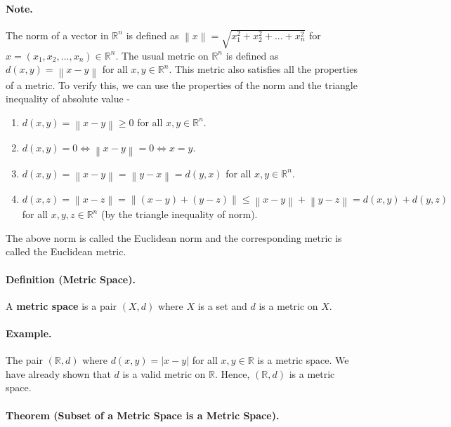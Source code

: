 \documentclass[openany]{book}
\numberwithin{equation}{section}
\begin{document}
\paragraph{Note.}

    The norm of a vector in $\mathbb{R}^n$ is defined as $\left\| x \right\| = \sqrt{x_1^2 + x_2^2 + ... + x_n^2}$ for $x = (x_1, x_2, ..., x_n) \in \mathbb{R}^n$. The usual metric on $\mathbb{R}^n$ is defined as $d(x, y) = \left\| x - y \right\|$ for all $x, y \in \mathbb{R}^n$. This metric also satisfies all the properties of a metric. To verify this, we can use the properties of the norm and the triangle inequality of absolute value - 
    \begin{enumerate}
        \item $d(x, y) = \left\| x - y \right\| \geq 0$ for all $x, y \in \mathbb{R}^n$.
        \item $d(x, y) = 0 \iff \left\| x - y \right\| = 0 \iff x = y$.
        \item $d(x, y) = \left\| x - y \right\| = \left\| y - x \right\| = d(y, x)$ for all $x, y \in \mathbb{R}^n$.
        \item $d(x, z) = \left\| x - z \right\| = \left\| (x - y) + (y - z) \right\| \leq \left\| x - y \right\| + \left\| y - z \right\| = d(x, y) + d(y, z)$ for all $x, y, z \in \mathbb{R}^n$ (by the triangle inequality of norm).
    \end{enumerate}
    The above norm is called the Euclidean norm and the corresponding metric is called the Euclidean metric.
\par
\paragraph{Definition (Metric Space).}

    A \textbf{metric space} is a pair $(X, d)$ where $X$ is a set and $d$ is a metric on $X$.
\par
\paragraph{Example.}

    The pair $(\mathbb{R}, d)$ where $d(x, y) = |x - y|$ for all $x, y \in \mathbb{R}$ is a metric space. We have already shown that $d$ is a valid metric on $\mathbb{R}$. Hence, $(\mathbb{R}, d)$ is a metric space.
\par
\paragraph{Theorem (Subset of a Metric Space is a Metric Space).}
\end{document}
